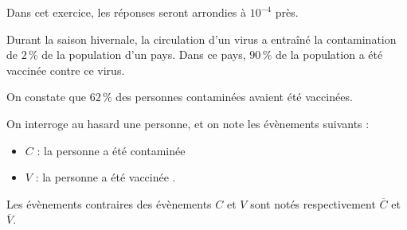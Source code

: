 Dans cet exercice, les réponses seront arrondies à $10^{-4}$ près.

\bigskip

Durant la saison hivernale, la circulation d'un virus a entraîné la contamination de $2\,\%$ de la population d'un pays. Dans ce pays, $90\,\%$ de la population a été vaccinée contre ce virus.

On constate que $62\,\%$ des personnes contaminées avaient été vaccinées.

\bigskip

On interroge au hasard une personne, et on note les évènements suivants :

\begin{itemize}
	\item[] $C$ : \og la personne a été contaminée \fg{}
	\item[] $V$ : \og la personne a été vaccinée \fg{}.
\end{itemize}

Les évènements contraires des évènements $C$ et $V$ sont notés respectivement $\overline{C}$ et $\overline{V}$.

